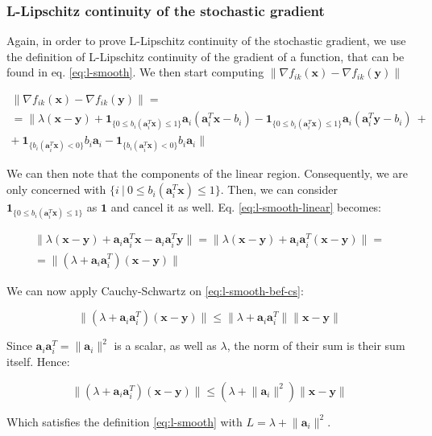 \documentclass[12pt]{article}
\newcommand{\xb}{\mathbf{x}}
\newcommand{\yb}{\mathbf{y}}
\newcommand{\ab}{\mathbf{a}}
\newcommand{\abi}{\ab_i}
\newcommand{\ax}{\abi^T\xb}
\newcommand{\ones}{\mathbf{1}}
\newcommand{\gradik}{\nabla f_{ik}}
\newcommand{\linearpred}{b_i(\ax) < 0}
\newcommand{\quadrpred}{0 \leq b_i(\ax) \leq 1}
\newcommand{\linearone}{\ones_{\{\linearpred\}}}
\newcommand{\quadrone}{\ones_{\{\quadrpred\}}}
\begin{document}
\subsubsection*{L-Lipschitz continuity of the stochastic gradient}

Again, in order to prove L-Lipschitz continuity of the stochastic gradient, we use the definition of L-Lipschitz continuity of the gradient of a function, that can be found in eq. \ref{eq:l-smooth}. We then start computing $\lVert \gradik (\xb) - \gradik (\yb) \rVert$

\begin{gather}
    \lVert \gradik (\xb) - \gradik (\yb) \rVert = \nonumber \\
    = \lVert \lambda(\xb - \yb) + \quadrone \ab_i(\abi^T\xb - b_i) - \quadrone \ab_i(\abi^T\yb - b_i) \ + \nonumber \\ + \ \linearone b_i \abi - \linearone b_i \abi \rVert \label{eq:l-smooth-linear}
\end{gather}

We can then note that the components of the linear region. Consequently, we are only concerned with $\{i \ | \ \quadrpred\}$. Then, we can consider $\quadrone$ as $\ones$ and cancel it as well. Eq. \eqref{eq:l-smooth-linear} becomes:

\begin{gather}
    \lVert \lambda(\xb - \yb) + \abi \abi^T \xb - \abi \abi^T \yb \rVert =
    \lVert \lambda(\xb - \yb) + \abi \abi^T(\xb - \yb) \rVert = \nonumber \\
    =  \lVert (\lambda + \abi \abi^T)(\xb - \yb) \rVert \label{eq:l-smooth-bef-cs}
\end{gather}

We can now apply Cauchy-Schwartz on \eqref{eq:l-smooth-bef-cs}:

\begin{equation*}
    \lVert (\lambda + \abi \abi^T)(\xb - \yb) \rVert \leq  \lVert \lambda + \abi \abi^T \rVert \lVert \xb - \yb \rVert
\end{equation*}

Since $\abi \abi^T = \lVert \abi \rVert ^2$ is a scalar, as well as $\lambda$, the norm of their sum is their sum itself. Hence:

\begin{equation}
    \lVert (\lambda + \abi \abi^T)(\xb - \yb) \rVert \leq (\lambda + \lVert \abi \rVert ^ 2) \lVert \xb - \yb \rVert
\end{equation}

Which satisfies the definition \eqref{eq:l-smooth} with $L = \lambda + \lVert \abi \rVert ^ 2$.
\end{document}
